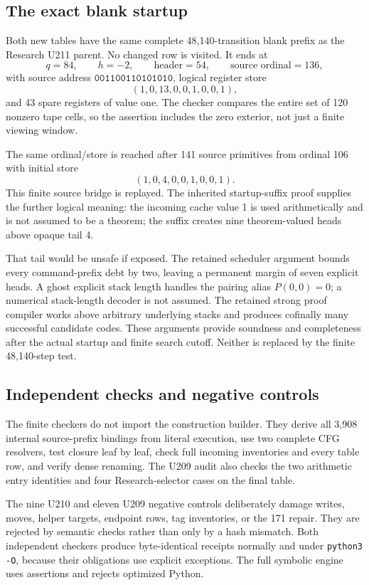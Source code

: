 \subsection{The exact blank startup}
Both new tables have the same complete 48,140-transition blank prefix as
the Research U211 parent. No changed row is visited. It ends at
\[
 q=84,\qquad h=-2,\qquad \text{header}=54,\qquad
 \text{source ordinal}=136,
\]
with source address \(\texttt{001100110101010}\), logical register store
\[
                         (1,0,13,0,0,1,0,0,1),
\]
and 43 spare registers of value one. The checker compares the entire set
of 120 nonzero tape cells, so the assertion includes the zero exterior,
not just a finite viewing window.

The same ordinal/store is reached after 141 source primitives from ordinal
106 with initial store
\[ (1,0,4,0,0,1,0,0,1). \]
This finite source bridge is replayed.
The inherited startup-suffix proof supplies the further logical meaning:
the incoming cache value 1 is used arithmetically and is not assumed to be
a theorem; the suffix creates nine theorem-valued heads above opaque tail 4.

That tail would be unsafe if exposed. The retained scheduler argument bounds
every command-prefix debt by two, leaving a permanent margin of seven
explicit heads. A ghost explicit stack length handles the pairing alias
\(P(0,0)=0\); a numerical stack-length decoder is not assumed. The retained
strong proof compiler works above arbitrary underlying stacks and produces
cofinally many successful candidate codes. These arguments provide soundness
and completeness after the actual startup and finite search cutoff.
Neither is replaced by the finite 48,140-step test.

\subsection{Independent checks and negative controls}
The finite checkers do not import the construction builder. They derive all
3,908 internal source-prefix bindings from literal execution, use two
complete CFG resolvers, test closure leaf by leaf, check full incoming
inventories and every table row, and verify dense renaming.
The U209 audit also checks the two arithmetic entry identities and four
Research-selector cases on the final table.

The nine U210 and eleven U209 negative controls deliberately damage writes,
moves, helper targets, endpoint rows, tag inventories, or the 171 repair.
They are rejected by semantic checks rather than only by a hash mismatch.
Both independent checkers produce byte-identical receipts normally and under
\texttt{python3 -O}, because their obligations use explicit exceptions.
The full symbolic engine uses assertions and rejects optimized Python.

